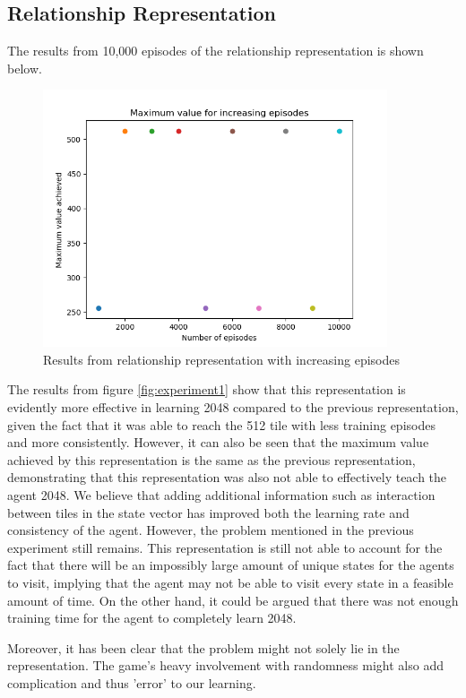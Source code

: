 \subsection{Relationship Representation}
The results from 10,000 episodes of the relationship representation is shown below.
\\

\begin{figure}[h]
	\centering
	\includegraphics[width=4.0in]{experiment2}
	\caption{Results from relationship representation with increasing episodes}
	\label{fig:experiment2}
\end{figure}

The results from figure \ref{fig:experiment1} show that this representation is evidently more effective in learning 2048 compared to the previous representation, given the fact that it was able to reach the 512 tile with less training episodes and more consistently. However, it can also be seen that the maximum value achieved by this representation is the same as the previous representation, demonstrating that this representation was also not able to effectively teach the agent 2048. We believe that adding additional information such as interaction between tiles in the state vector has improved both the learning rate and consistency of the agent. However, the problem mentioned in the previous experiment still remains. This representation is still not able to account for the fact that there will be an impossibly large amount of unique states for the agents to visit, implying that the agent may not be able to visit every state in a feasible amount of time. 
On the other hand, it could be argued that there was not enough training time for the agent to completely learn 2048.

Moreover, it has been clear that the problem might not solely lie in the representation. The game's heavy involvement with randomness might also add complication and thus 'error' to our learning.
